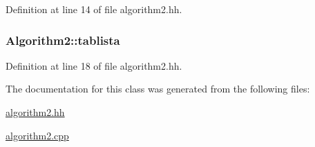 Definition at line 14 of file algorithm2.\+hh.

\hypertarget{class_algorithm2_af58d491bdb13e788c40754617f3b13df}{}
\subsubsection[{tablista}]{ Algorithm2\+::tablista\hspace{0.3cm}{\ttfamily [private]}}\label{class_algorithm2_af58d491bdb13e788c40754617f3b13df}


Definition at line 18 of file algorithm2.\+hh.



The documentation for this class was generated from the following files\+:\begin{DoxyCompactItemize}
\item 
\hyperlink{algorithm2_8hh}{algorithm2.\+hh}\item 
\hyperlink{algorithm2_8cpp}{algorithm2.\+cpp}\end{DoxyCompactItemize}
